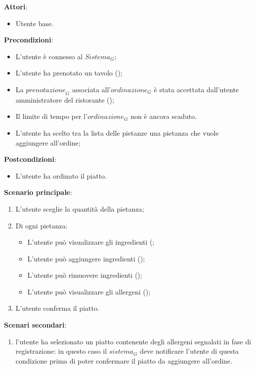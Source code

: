\textbf{Attori}:
\begin{itemize}
    \item Utente base.
\end{itemize}
\textbf{Precondizioni}:
\begin{itemize}
    \item L'utente è connesso al $\textit{Sistema}_G$; 
    \item L'utente ha prenotato un tavolo ();
    \item La $\textit{prenotazione}_G$ associata all'$\textit{ordinazione}_G$ è stata accettata dall'utente amministratore del ristorante ();
    \item Il limite di tempo per l'$\textit{ordinazione}_G$ non è ancora scaduto.
    \item L'utente ha scelto tra la lista delle pietanze una pietanza che vuole aggiungere all'ordine;
\end{itemize}
\textbf{Postcondizioni}:
\begin{itemize}
    \item L'utente ha ordinato il piatto.
\end{itemize}
\textbf{Scenario principale}:
\begin{enumerate}
    \item L'utente sceglie la quantità della pietanza;
    \item Di ogni pietanza:
    \begin{itemize}
        \item L'utente può visualizzare gli ingredienti (;
        \item L'utente può aggiungere ingredienti ();
        \item L'utente può rimuovere ingredienti ();
        \item L'utente può visualizzare gli allergeni ();
    \end{itemize}
    \item L'utente conferma il piatto.
\end{enumerate}
\textbf{Scenari secondari}:

\begin{enumerate}
    \item l'utente ha selezionato un piatto contenente degli allergeni segnalati in fase di registrazione: in questo caso il $\textit{sistema}_G$ deve notificare l'utente di questa condizione prima di poter confermare il piatto da aggiungere all'ordine.
\end{enumerate}

